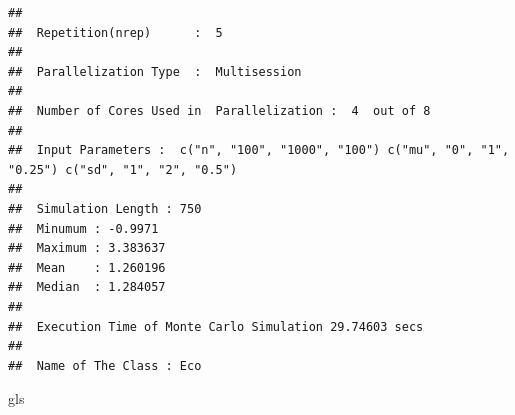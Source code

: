 \documentclass[11pt,a4paper]{article}
\newenvironment{Shaded}{\begin{snugshade}}{\end{snugshade}}
\newcommand{\NormalTok}[1]{#1}
\begin{document}
\begin{verbatim}
## 
##  Repetition(nrep)      :  5 
## 
##  Parallelization Type  :  Multisession 
## 
##  Number of Cores Used in  Parallelization :  4  out of 8 
## 
##  Input Parameters :  c("n", "100", "1000", "100") c("mu", "0", "1", "0.25") c("sd", "1", "2", "0.5") 
## 
##  Simulation Length : 750 
##  Minumum : -0.9971 
##  Maximum : 3.383637 
##  Mean    : 1.260196 
##  Median  : 1.284057 
## 
##  Execution Time of Monte Carlo Simulation 29.74603 secs 
## 
##  Name of The Class : Eco
\end{verbatim}

\begin{Shaded}
\begin{Highlighting}[]
\NormalTok{gls}
\end{Highlighting}
\end{Shaded}
\end{document}
